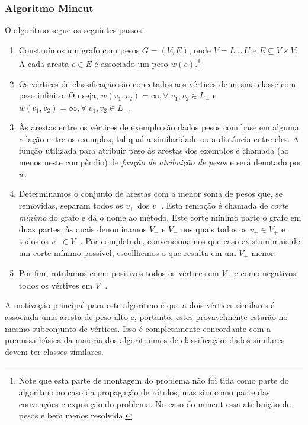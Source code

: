 \documentclass[12pt]{article}
\begin{document}
\subsubsection{Algoritmo Mincut}
O algorítmo segue os seguintes passos:

\begin{enumerate}
  \item Construímos um grafo com pesos $G = (V,E)$, onde $V = L \cup U$ e $E \subseteq V \times V$. A cada aresta $e \in E$ é associado um peso $w(e)$.\footnote{Note que esta parte de montagem do problema não foi tida como parte do algoritmo no caso da propagação de rótulos, mas sim como parte das convenções e exposição do problema. No caso do mincut essa atribuição de pesos é bem menos resolvida.}

  \item Os vértices de classificação são conectados aos vértices de mesma classe com peso infinito. Ou seja, $w(v_1,v_2) = \infty, \forall \; v_1,v_2 \in L_+$ e $w(v_1,v_2) = \infty, \forall \; v_1,v_2 \in L_-$.

  \item Às arestas entre os vértices de exemplo são dados pesos com base em alguma relação entre os exemplos, tal qual a similaridade ou a distância entre eles. A função utilizada para atribuir peso às arestas dos exemplos é chamada (ao menos neste compêndio) de \emph{função de atribuição de pesos} e será denotado por $w$.

  \item Determinamos o conjunto de arestas com a menor soma de pesos que, se removidas, separam todos os $v_+$ dos $v_-$. Esta remoção é chamada de \emph{corte mínimo} do grafo e dá o nome ao método. Este corte mínimo parte o grafo em duas partes, às quais denominamos $V_+$ e $V_-$ nos quais todos os $v_+ \in V_+$ e todos os $v_- \in V_-$. Por completude, convencionamos que caso existam mais de um corte mínimo possível, escollhemos o que resulta em um $V_+$ menor.

  \item Por fim, rotulamos como positivos todos os vértices em $V_+$ e como negativos todos os vértives em $V_-$.
\end{enumerate}

A motivação principal para este algorítmo é que a dois vértices similares é associada uma aresta de peso alto e, portanto, estes provavelmente estarão no mesmo subconjunto de vértices. Isso é completamente concordante com a premissa básica da maioria dos algorítmimos de classificação: dados similares devem ter classes similares. 
\end{document}
